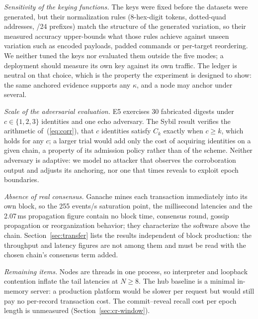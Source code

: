\documentclass[conference]{IEEEtran}
\begin{document}
\emph{Sensitivity of the keying functions.} The keys were fixed before the datasets were generated, but their normalization rules (8-hex-digit tokens, dotted-quad addresses, /24 prefixes) match the structure of the generated variation, so their measured accuracy upper-bounds what those rules achieve against unseen variation such as encoded payloads, padded commands or per-target reordering. We neither tuned the keys nor evaluated them outside the five modes; a deployment should measure its own key against its own traffic. The ledger is neutral on that choice, which is the property the experiment is designed to show: the same anchored evidence supports any $\kappa$, and a node may anchor under several.

\emph{Scale of the adversarial evaluation.} E5 exercises 30 fabricated digests under $c\in\{1,2,3\}$ identities and one echo adversary. The Sybil result verifies the arithmetic of~(\ref{eq:corr}), that $c$ identities satisfy $C_k$ exactly when $c\ge k$, which holds for any $c$; a larger trial would add only the cost of acquiring identities on a given chain, a property of its admission policy rather than of the scheme. Neither adversary is adaptive: we model no attacker that observes the corroboration output and adjusts its anchoring, nor one that times reveals to exploit epoch boundaries.

\emph{Absence of real consensus.} Ganache mines each transaction immediately into its own block, so the 255 events/s saturation point, the millisecond latencies and the 2.07\,ms propagation figure contain no block time, consensus round, gossip propagation or reorganization behavior; they characterize the software above the chain. Section~\ref{sec:transfer} lists the results independent of block production: the throughput and latency figures are not among them and must be read with the chosen chain's consensus term added.

\emph{Remaining items.} Nodes are threads in one process, so interpreter and loopback contention inflate the tail latencies at $N\ge 8$. The hub baseline is a minimal in-memory server: a production platform would be slower per request but would still pay no per-record transaction cost. The commit--reveal recall cost per epoch length is unmeasured (Section~\ref{sec:cr-window}).
\end{document}
